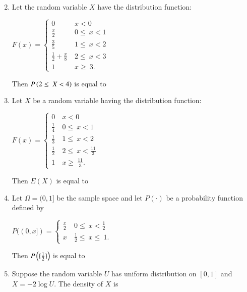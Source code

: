 \begin{enumerate}[label=\thesection.\arabic*.,ref=\thesection.\theenumi]
\begin{enumerate}
\begin{multicols}{2}
\end{multicols}
\end{enumerate}
\solution


\item Let the random variable $X$ have the distribution function: 
\begin{center}
$ 
F(x)=
\begin{cases}
0 &  \ x<0 \\
\frac{x}{2} &  \ 0\leq\ x <1 \\
\frac{3}{5} &  \ 1\leq\ x<2\\
\frac{1}{2}+\frac{x}{8} &  \ 2\leq\ x<3\\
1 &  \ x\geq\ 3.
\end{cases}
$\\ 
\end{center}

Then $P\left(2 \leq\ X<4\right)$ is equal to \underline{\hspace{3cm}}
 \\
\solution

%
\item Let $X$ be a random variable having the distribution function: 
\begin{center}
$ 
F(x)=
\begin{cases}
0 &  \ x<0 \\
\frac{1}{4} &  \ 0\leq\ x <1 \\
\frac{1}{3} &  \ 1\leq\ x<2\\
\frac{1}{2} &  \ 2\leq\ x<\frac{11}{3}\\
1 &  \ x\geq\ \frac{11}{3}.
\end{cases}
$\\ 
\end{center}

Then $E(X)$ is equal to \underline{\hspace{3cm}}
%
\item Let $\Omega= (0,1]$ be the sample space and let $P(\cdot)$ be a probability function defined by 

\begin{center}
$ 
P((0,x])=
\begin{cases}
\frac{x}{2} &  \ 0 \leq\ x< \frac{1}{2} \\
x &  \  \frac{1}{2} \leq\ x \leq\ 1.
\end{cases}
$\\ 
\end{center}

Then $P\left(\lbrace\frac{1}{2}\rbrace\right)$ is equal to \underline{\hspace{3cm}}
%
\item Suppose the random variable $U$ has uniform distribution on $[0,1]$ and $X= -2\log U$. The density of $X$ is


\end{enumerate}
